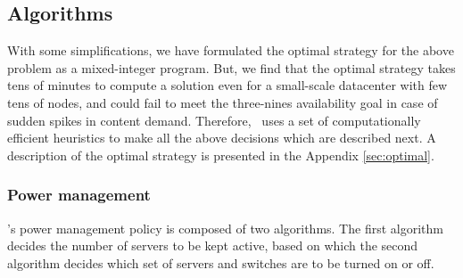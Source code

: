 \subsection{Algorithms}
\label{sec:heuristic}

With some simplifications, we have formulated the optimal strategy for the above problem as a mixed-integer program. But, we find that the optimal strategy takes tens of minutes to compute a solution even for a small-scale datacenter with few tens of nodes, and could fail to meet the three-nines availability goal in case of sudden spikes in content demand. Therefore, \shrink\ uses a set of computationally efficient heuristics to make all the above decisions which are described next. A description of the optimal strategy is presented in the Appendix \ref{sec:optimal}.


\subsubsection{Power management}



\shrink's power management policy is composed of two algorithms. The first algorithm decides the number of servers to be kept active, based on which the second algorithm decides which set of servers and switches are to be turned on or off. 


